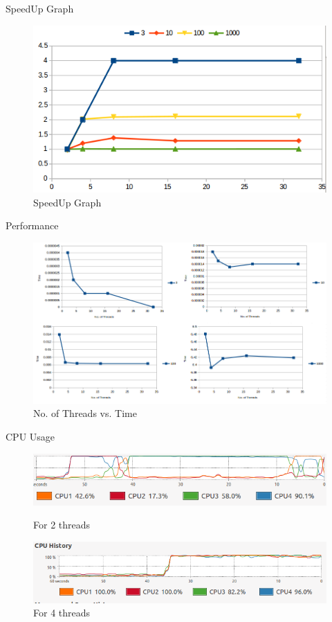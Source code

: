 \documentclass{beamer}
\begin{document}
\begin{frame}{SpeedUp Graph}
\begin{center}
\begin{figure}[htp]
\centering
\includegraphics[scale=.4]{spu.png}
\caption{SpeedUp Graph}
\end{figure}
\end{center}
\end{frame}

\begin{frame}{Performance}
\begin{figure}[htp]
\centering
\includegraphics[scale=.3]{pp.png}
\caption{No. of Threads vs. Time}
\end{figure}
\end{frame}

\begin{frame}{CPU Usage}
\begin{figure}[htp]
\centering
\includegraphics[scale=.4]{thr2.png}
\caption{For 2 threads}
\includegraphics[scale=.4]{thr_4.png}
\caption{For 4 threads}
\end{figure}
\end{frame}
\end{document}
